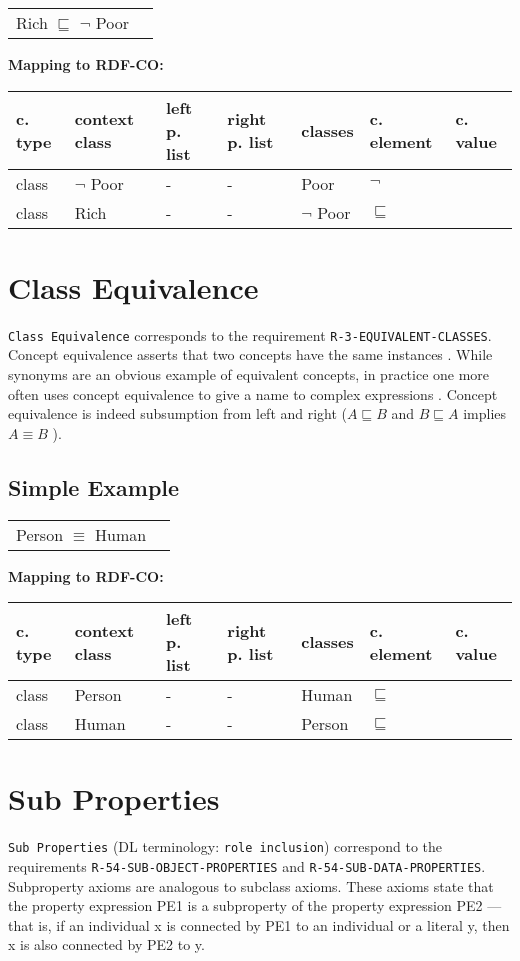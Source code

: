 \documentclass{llncs}
\newcommand{\ms}[1]{\texttt{#1}}
\newenvironment{gcotable}{
  \scriptsize
  \sffamily
  \vspace{0cm}
	\begin{center}
	\textbf{\vspace{0.4cm}Mapping to RDF-CO:} \\
  \begin{tabular}{l|l|l|l|l|l|l}
	\hline
  \textbf{c. type} & \textbf{context class} & \textbf{left p. list} & \textbf{right p. list} & \textbf{classes} & \textbf{c. element} & \textbf{c. value} \\
  \hline

}{
  \hline
  \end{tabular}
	\end{center}
}
\newenvironment{DL}{
  \vspace{0cm}
	\begin{center}
  \begin{tabular}{r l}

}{
  \end{tabular}
	\end{center}
}
\begin{document}
\begin{DL}
Rich $\sqsubseteq$ $\neg$ Poor 
\end{DL}

\begin{gcotable}
class & $\neg$ Poor & - & - & Poor & $\neg$ \\
class & Rich & - & - & $\neg$ Poor & $\sqsubseteq$ \\
\end{gcotable}

\section{Class Equivalence}

\ms{Class Equivalence} corresponds to the requirement \ms{R-3-EQUIVALENT-CLASSES}.
Concept equivalence asserts that two concepts have the same instances \cite{Kroetzsch2012}.
While synonyms are an obvious example of equivalent concepts, in practice one more
often uses concept equivalence to give a name to complex expressions \cite{Kroetzsch2012}.
Concept equivalence is indeed subsumption from left and right ($A \sqsubseteq B$ and $B \sqsubseteq A$ implies $A \equiv B$ ).

\subsection{Simple Example}

\begin{DL}
Person $\equiv$ Human
\end{DL}

\begin{gcotable}
class & Person & - & - & Human & $\sqsubseteq$ \\
class & Human & - & - & Person & $\sqsubseteq$ \\
\end{gcotable}

\section{Sub Properties}

\ms{Sub Properties} (DL terminology: \ms{role inclusion}) correspond to the requirements \ms{R-54-SUB-OBJECT-PROPERTIES} and \ms{R-54-SUB-DATA-PROPERTIES}.
Subproperty axioms are analogous to subclass axioms.
These axioms state that the property expression PE1 is a subproperty of the property expression PE2 — that is, if an individual x is connected by PE1 to an individual or a literal y, then x is also connected by PE2 to y. 
\end{document}
